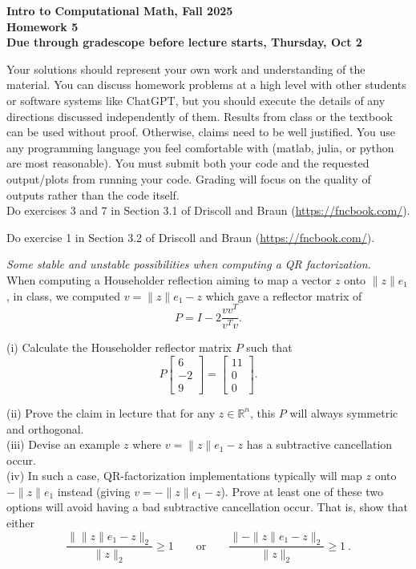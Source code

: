 \documentclass[11pt]{article}
\begin{document}
\begin{center}
{\bf Intro to Computational Math, Fall 2025\\
Homework 5\\
Due through gradescope before lecture starts, Thursday, Oct 2}
\end{center}

Your solutions should represent your own work and understanding of the material. You can discuss homework problems at a high level with other students or software systems like ChatGPT, but you should execute the details of any directions discussed independently of them. Results from class or the textbook can be used without proof. Otherwise, claims need to be well justified. You use any programming language you feel comfortable with (matlab, julia, or python are most reasonable). You must submit both your code and the requested output/plots from running your code. Grading will focus on the quality of outputs rather than the code itself.\\

 Do exercises 3 and 7 in Section 3.1 of Driscoll and Braun (\url{https://fncbook.com/}).\\

\vskip1cm

 Do exercise 1 in Section 3.2 of Driscoll and Braun (\url{https://fncbook.com/}).\\

\vskip1cm

 {\it Some stable and unstable possibilities when computing a QR factorization.}\\
When computing a Householder reflection aiming to map a vector $z$ onto $\|z\|e_1$, in class, we computed $v = \|z\|e_1 - z$ which gave a reflector matrix of
$$ P = I - 2\frac{vv^T}{v^Tv}. $$

\noindent (i) Calculate the Householder reflector matrix $P$ such that
$$ P \begin{bmatrix} 6\\ -2\\ 9\end{bmatrix} = \begin{bmatrix} 11\\ 0\\ 0\end{bmatrix}.$$

\noindent (ii) Prove the claim in lecture that for any $z\in \mathbb{R}^n$, this $P$ will always symmetric and orthogonal.\\

\noindent (iii) Devise an example $z$ where $v = \|z\|e_1 - z$ has a subtractive cancellation occur.\\

\noindent (iv) In such a case, QR-factorization implementations typically will map $z$ onto $-\|z\|e_1$ instead (giving $v = -\|z\|e_1-z$). Prove at least one of these two options will avoid having a bad subtractive cancellation occur. That is, show that either
$$ \frac{\|\|z\|e_1 - z\|_2}{\|z\|_2} \geq 1 \qquad \text{or} \qquad \frac{\|-\|z\|e_1 - z\|_2}{\|z\|_2} \geq 1 \ . $$
\end{document}
